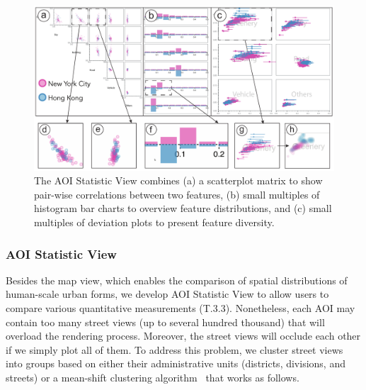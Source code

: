 \begin{figure}[t]
	\centering
	\includegraphics[width=0.85\columnwidth]{figure/streetvizor/fig5_statistic_view/statistic_view}
	\vspace{-4mm}
	\caption{The AOI Statistic View combines (a) a scatterplot matrix to show pair-wise correlations between two features, (b) small multiples of histogram bar charts to overview feature distributions, and (c) small multiples of deviation plots to present feature diversity. }
	\label{fig:statistic_view}
	\vspace{-4mm}
\end{figure}

\subsubsection{AOI Statistic View}
\label{sssec:statistic_view}
Besides the map view, which enables the comparison of spatial distributions of human-scale urban forms, we develop AOI Statistic View to allow users to compare various quantitative measurements (T.3.3).
Nonetheless, each AOI may contain too many street views (up to several hundred thousand) that will overload the rendering process.
Moreover, the street views will occlude each other if we simply plot all of them.
To address this problem, we cluster street views into groups based on either their administrative units (districts, divisions, and streets) or a mean-shift clustering algorithm~\cite{comaniciu_2002_meanshift} that works as follows.
 
